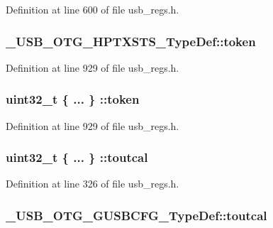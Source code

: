 Definition at line 600 of file usb\-\_\-regs.\-h.

\hypertarget{group___u_s_b___o_t_g___d_r_i_v_e_r_gab78bb9c560c5ce625d76f00ff4b70791}{
\subsubsection[{token}]{ \-\_\-\-U\-S\-B\-\_\-\-O\-T\-G\-\_\-\-H\-P\-T\-X\-S\-T\-S\-\_\-\-Type\-Def\-::token}}\label{group___u_s_b___o_t_g___d_r_i_v_e_r_gab78bb9c560c5ce625d76f00ff4b70791}


Definition at line 929 of file usb\-\_\-regs.\-h.

\hypertarget{group___u_s_b___o_t_g___d_r_i_v_e_r_gacb4d9cdd7ecfd6607e8db6fc6688d24c}{
\subsubsection[{token}]{\setlength{\rightskip}{0pt plus 5cm}uint32\-\_\-t \{ ... \} \-::token}}\label{group___u_s_b___o_t_g___d_r_i_v_e_r_gacb4d9cdd7ecfd6607e8db6fc6688d24c}


Definition at line 929 of file usb\-\_\-regs.\-h.

\hypertarget{group___u_s_b___o_t_g___d_r_i_v_e_r_gab26e67752052769a810a6bde6a686bcb}{
\subsubsection[{toutcal}]{\setlength{\rightskip}{0pt plus 5cm}uint32\-\_\-t \{ ... \} \-::toutcal}}\label{group___u_s_b___o_t_g___d_r_i_v_e_r_gab26e67752052769a810a6bde6a686bcb}


Definition at line 326 of file usb\-\_\-regs.\-h.

\hypertarget{group___u_s_b___o_t_g___d_r_i_v_e_r_ga5ff2c9d380b6cf9797c300917954d000}{
\subsubsection[{toutcal}]{ \-\_\-\-U\-S\-B\-\_\-\-O\-T\-G\-\_\-\-G\-U\-S\-B\-C\-F\-G\-\_\-\-Type\-Def\-::toutcal}}\label{group___u_s_b___o_t_g___d_r_i_v_e_r_ga5ff2c9d380b6cf9797c300917954d000}


